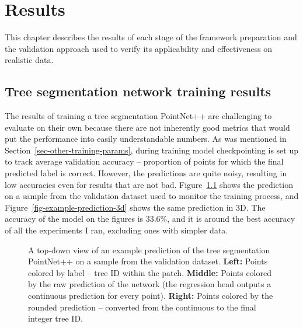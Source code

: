 \chapter{Results}\label{cap:results}

This chapter describes the results of each stage of the framework preparation and the validation approach used to verify its applicability and effectiveness on realistic data.

\section{Tree segmentation network training results}

The results of training a tree segmentation PointNet++ are challenging to evaluate on their own because there are not inherently good metrics that would put the performance into easily understandable numbers.
As was mentioned in Section~\ref{sec-other-training-params}, during training model checkpointing is set up to track average validation accuracy – proportion of points for which the final predicted label is correct.
However, the predictions are quite noisy, resulting in low accuracies even for results that are not bad.
Figure~\ref{fig-example-prediction-2d} shows the prediction on a sample from the validation dataset used to monitor the training process, and Figure~\ref{fig-example-prediction-3d} shows the same prediction in 3D.
The accuracy of the model on the figures is 33.6\%, and it is around the best accuracy of all the experiments I ran, excluding ones with simpler data.

\begin{figure}
\caption[A top-down view of an example prediction of the tree segmentation PointNet++.]{\label{fig-example-prediction-2d}A top-down view of an example
prediction of the tree segmentation PointNet++ on a sample from the
validation dataset. \textbf{Left:} Points colored by label -- tree ID
within the patch. \textbf{Middle:} Points colored by the raw prediction
of the network (the regression head outputs a continuous prediction for
every point). \textbf{Right:} Points colored by the rounded prediction
-- converted from the continuous to the final integer tree ID.}
\end{figure}

